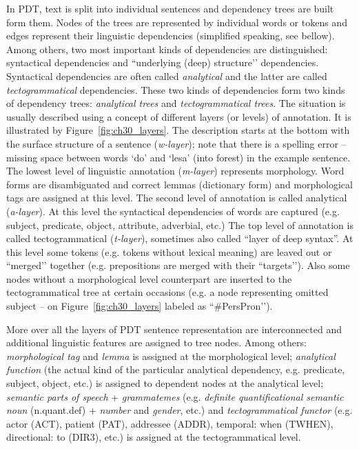 In PDT, text is split into individual sentences and dependency trees are built form them. Nodes of the trees are represented by individual words or tokens and edges represent their linguistic dependencies (simplified speaking, see bellow). Among others, two most important kinds of dependencies are distinguished: syntactical dependencies and ``underlying (deep) structure’’ dependencies. Syntactical dependencies are often called \emph{analytical} and the latter are called \emph{tectogrammatical} dependencies. These two kinds of dependencies form two kinds of dependency trees: \emph{analytical trees} and \emph{tectogrammatical trees}. The situation is usually described using a concept of different layers (or levels) of annotation. It is illustrated by Figure~\ref{fig:ch30_layers}. The description starts at the bottom with the surface structure of a sentence (\emph{w-layer}); note that there is a spelling error -- missing space between words `do’ and `lesa’ (into forest) in the example sentence. The lowest level of linguistic annotation (\emph{m-layer}) represents morphology. Word forms are disambiguated and correct lemmas (dictionary form) and morphological tags are assigned at this level. The second level of annotation is called analytical (\emph{a-layer}). At this level the syntactical dependencies of words are captured (e.g. subject, predicate, object, attribute, adverbial, etc.) The top level of annotation is called tectogrammatical (\emph{t-layer}), sometimes also called ``layer of deep syntax''. At this level some tokens (e.g. tokens without lexical meaning) are leaved out or ``merged’’ together (e.g. prepositions are merged with their ``targets’’). Also some nodes without a morphological level counterpart are inserted to the tectogrammatical tree at certain occasions (e.g. a node representing omitted subject -- on Figure~\ref{fig:ch30_layers} labeled as ``\#PersPron’’).  

More over all the layers of PDT sentence representation are interconnected and additional linguistic features are assigned to tree nodes. Among others: \emph{morphological tag} and \emph{lemma} is assigned at the morphological level; \emph{analytical function} (the actual kind of the particular analytical dependency, e.g. predicate, subject, object, etc.) is assigned to dependent nodes at the analytical level; \emph{semantic parts of speech} + \emph{grammatemes} (e.g. \emph{definite quantificational semantic noun} (n.quant.def) + \emph{number} and \emph{gender}, etc.) and \emph{tectogrammatical functor} (e.g. actor (ACT), patient (PAT), addressee (ADDR), temporal: when (TWHEN), directional: to (DIR3), etc.) is assigned at the tectogrammatical level. 

